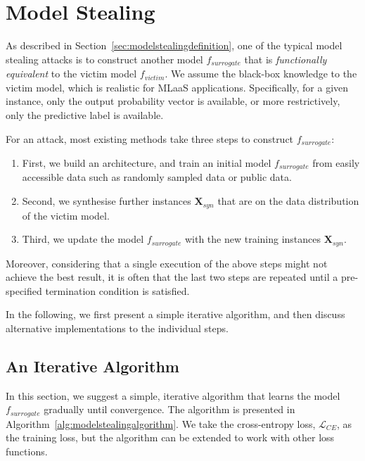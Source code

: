 

\section{Model Stealing}\label{sec:modelstealingDL}

As described in Section~\ref{sec:modelstealingdefinition}, one of the typical model stealing attacks is to construct another model $f_{surrogate}$ that is \emph{functionally equivalent} to the victim model $f_{victim}$. %
%
We assume the black-box knowledge to the victim model, which is realistic for MLaaS applications. Specifically, for a given instance, only the output probability vector is available, or more restrictively, only the predictive label is available.   
%


For an attack, most existing methods take three steps to construct $f_{surrogate}$: \begin{enumerate}
    \item First, we build an architecture, and train an initial model $f_{surrogate}$ from easily accessible data such as randomly sampled data or public data. 
    \item Second, we synthesise further instances $\textbf{X}_{syn}$ that are on the data distribution of the victim model. 
    \item Third, we update the model $f_{surrogate}$ with the new training instances $\textbf{X}_{syn}$. 
\end{enumerate}
Moreover, considering that a single execution of the above steps might not achieve the best result, it is often that the last two steps are repeated until a pre-specified termination condition is satisfied. 

In the following, we first present a simple iterative algorithm, and then discuss alternative implementations to the individual steps. 

\subsection*{An Iterative Algorithm}

In this section, we suggest a simple, iterative algorithm that learns the model $f_{surrogate}$ gradually until convergence. The algorithm is presented in Algorithm~\ref{alg:modelstealingalgorithm}. We take the cross-entropy loss, $\mathcal{L}_{CE}$, as the training loss, but the algorithm can be extended to work with other loss functions. 

